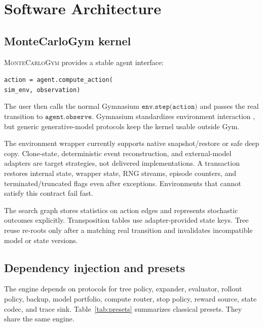 \documentclass[10pt,twocolumn]{article}
\newcommand{\mcg}{\textsc{MonteCarloGym}\xspace}
\begin{document}
\section{Software Architecture}

\subsection{MonteCarloGym kernel}

\mcg provides a stable agent interface:
\begin{center}
\small\texttt{action = agent.compute\_action(}\\
\small\texttt{sim\_env, observation)}
\end{center}
The user then calls the normal Gymnasium
\(\texttt{env.step(action)}\) and passes the real transition to
\(\texttt{agent.observe}\). Gymnasium standardizes environment interaction
\citep{towers2024gymnasium}, but generic generative-model protocols keep the
kernel usable outside Gym.

The environment wrapper currently supports native snapshot/restore or safe deep
copy. Clone-state, deterministic event reconstruction, and external-model
adapters are target strategies, not delivered implementations. A
transaction restores internal state, wrapper state, RNG streams, episode
counters, and terminated/truncated flags even after exceptions. Environments
that cannot satisfy this contract fail fast.

The search graph stores statistics on action edges and represents stochastic
outcomes explicitly. Transposition tables use adapter-provided state keys. Tree
reuse re-roots only after a matching real transition and invalidates
incompatible model or state versions.

\subsection{Dependency injection and presets}

The engine depends on protocols for tree policy, expander, evaluator, rollout
policy, backup, model portfolio, compute router, stop policy, reward source,
state codec, and trace sink. Table~\ref{tab:presets} summarizes classical
presets. They share the same engine.
\end{document}
